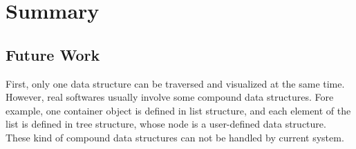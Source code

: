 \chapter {Summary}
\label {Summary}

\section {Future Work}
First, only one data structure can be traversed and visualized at the same time. However, real softwares usually involve some compound data structures. Fore example, one container object is defined in list structure, and each element of the list is defined in tree structure, whose node is a user-defined data structure. These kind of compound data structures can not be handled by current system.